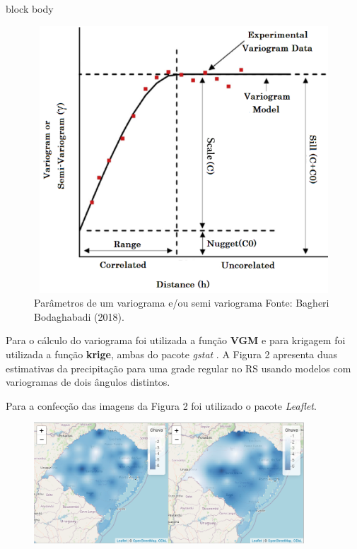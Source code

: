 \documentclass[final]{beamer}
\newlength{\colwidth}
\begin{document}
\begin{frame}[t]
\begin{columns}[t]
\begin{column}{\colwidth}
\begin{beamercolorbox}[wd=\colwidth, sep=2pt, leftskip=2pt, rightskip=2pt]{block body}
\begin{figure}
\includegraphics[width=15cm, height=10cm]{img/krig_ord/variogram.png}
    \caption{Parâmetros de um variograma e/ou semi variograma  Fonte: Bagheri Bodaghabadi (2018). \cite{bagheri2018necessarily}}
    \label{fig:variogram}
\end{figure}


           
\end{beamercolorbox}


\hspace{1 cm} Para o cálculo do variograma foi utilizada a função \textbf{VGM} e para krigagem foi utilizada a função \textbf{krige}, ambas do pacote \textit{gstat} \cite{gstat2}. A Figura 2 apresenta duas estimativas da precipitação para uma grade regular no RS usando modelos com variogramas de dois ângulos distintos.

Para a confecção das imagens da Figura 2 foi utilizado o pacote \textit{Leaflet}\cite{leaflet}. 

\begin{figure}
  \includegraphics[width=0.9\textwidth]{./img/krig_ord/krig_all_angles2.png}
    \begin{center}
    \caption{}
  \end{center}
  \label{fig:2}  
\end{figure}


\end{column}
\end{columns}
\end{frame}
\end{document}
